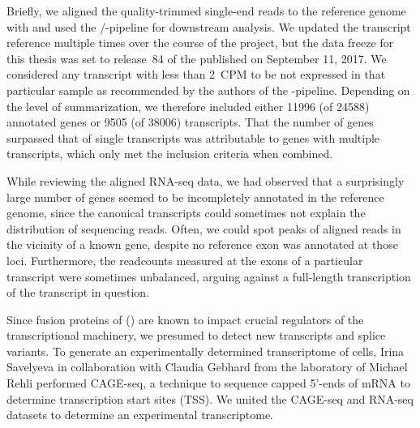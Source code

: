 Briefly, we aligned the  quality-trimmed single-end reads to the \mmnine reference genome with \cite{Bushnell2014} and used the /-pipeline for downstream analysis. We updated the transcript reference multiple times over the course of the project, but the data freeze for this thesis was set to release~\num{84} of the  published on September 11, 2017. We considered any transcript with less than \SI{2}{CPM} to be not expressed in that particular sample as recommended by the authors of the -pipeline\cite{Chen2016c}. Depending on the level of summarization, we therefore included either \num{11996} (of \num{24588}) annotated genes or \num{9505} (of \num{38006}) transcripts. That the number of genes surpassed that of single transcripts was attributable to genes with multiple transcripts, which only met the inclusion criteria when combined. 

While reviewing the aligned RNA-seq data, we had observed that a surprisingly large number of genes seemed to be incompletely annotated in the reference genome, since the canonical transcripts could sometimes not explain the distribution of sequencing reads. Often, we could spot peaks of aligned reads in the vicinity of a known gene, despite no reference exon was annotated at those loci. Furthermore, the readcounts measured at the exons of a particular transcript were sometimes unbalanced, arguing against a full-length transcription of the transcript in question. 

Since fusion proteins of  (\mllfp) are known to impact crucial regulators of the transcriptional machinery\cite{Slany2016}, we presumed to detect new transcripts and splice variants. To generate an experimentally determined transcriptome of \mllafnine cells, Irina Savelyeva in collaboration with Claudia Gebhard from the laboratory of Michael Rehli performed CAGE-seq\cite{Carninci1996,Shiraki2003,Takahashi2012}, a technique to sequence capped 5'-ends of mRNA to determine transcription start sites (TSS). We united the CAGE-seq and RNA-seq datasets to determine an experimental transcriptome.
 
